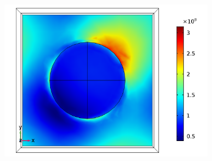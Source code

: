 \begin{figure}[htb!]
\begin{subfigure}{0.32\textwidth}
        \includegraphics[width=\linewidth]{figures/ch4/S5A/FieldDistribution/phi0-90/Sample5A_TM_Slice@z=0_wl=350_phi=45.png}
   \end{subfigure}


\end{figure}
